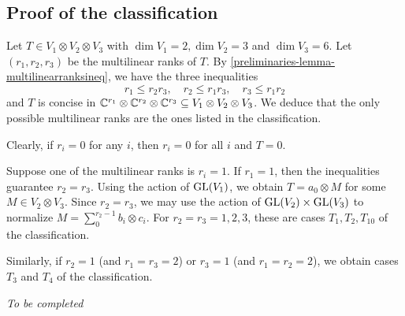 % 

\subsection{Proof of the classification}


Let $T \in V_1 \otimes V_2 \otimes V_3$ with $\dim V_1 =2, \dim V_2 = 3$ and $\dim V_3 = 6$. Let $(r_1,r_2,r_3)$ be the multilinear ranks of $T$. By \ref{preliminaries-lemma-multilinearranksineq}, we have the three inequalities
\[
r_1 \leq r_2r_3, \quad r_2 \leq r_1r_3, \quad r_3 \leq r_1r_2
\]
and $T$ is concise in $\mathbb{C}^{r_1} \otimes \mathbb{C}^{r_2} \otimes \mathbb{C}^{r_3} \subseteq V_1 \otimes V_2 \otimes V_3$. We deduce that the only possible multilinear ranks are the ones listed in the classification.

Clearly, if $r_i = 0$ for any $i$, then $r_i = 0$ for all $i$ and $T = 0$.

Suppose one of the multilinear ranks is $r_i = 1$. If $r_1 = 1$, then the inequalities guarantee $r_2 = r_3$. Using the action of $\mathrm{GL}(V_1)$, we obtain $T = a_0 \otimes M$ for some $M \in V_2 \otimes V_3$. Since $r_2 = r_3$, we may use the action of $\mathrm{GL}(V_2) \times \mathrm{GL}(V_3)$ to normalize $M = \sum_{0}^{r_2-1} b_i \otimes c_i$. For $r_2 = r_3 = 1,2,3$, these are cases $T_1,T_2,T_{10}$ of the classification. 

Similarly, if $r_2 = 1$ (and $r_1 = r_3 = 2$) or $r_3  = 1$ (and $r_1 = r_2 = 2$), we obtain cases $T_3$ and $T_4$ of the classification. 

{\it To be completed }
